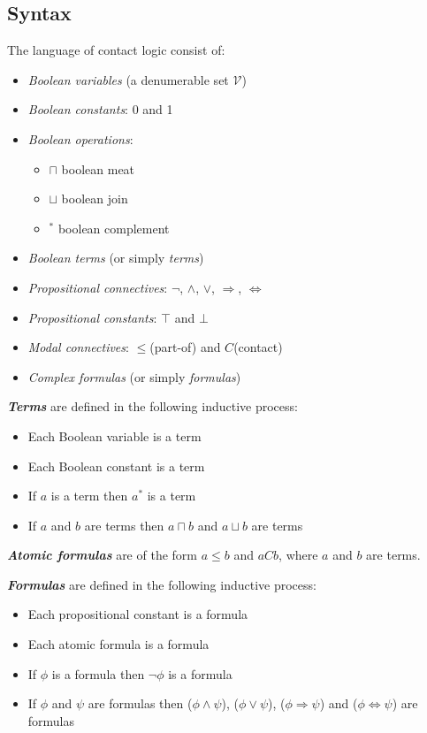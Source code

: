 \documentclass{article}
\newcommand\V{\mathcal{V}}
\begin{document}
	\subsection{Syntax}
	The language of contact logic consist of:
	\begin{itemize}
		\item \textit{Boolean variables} (a denumerable set $\V$)
		\item \textit{Boolean constants}: 0 and 1
		\item \textit{Boolean operations}:
		\begin{itemize}
			\item $\sqcap$ boolean meat
			\item $\sqcup$ boolean join
			\item $^*$ boolean complement
		\end{itemize}
		\item \textit{Boolean terms} (or simply \textit{terms})
		\item \textit{Propositional connectives}: $\neg$, $\land$, $\lor$, $\Rightarrow$, $\Leftrightarrow$
		\item \textit{Propositional constants}: $\top$ and $\bot$
		\item \textit{Modal connectives}: $\leq$(part-of) and $C$(contact)
		\item \textit{Complex formulas} (or simply \textit{formulas})
	\end{itemize}

	\noindent\textbf{\textit{Terms}} are defined in the following inductive process:
	\begin{itemize}
		\item Each Boolean variable is a term
		\item Each Boolean constant is a term
		\item If $a$ is a term then $a^*$ is a term
		\item If $a$ and $b$ are terms then $a \sqcap b$ and $a \sqcup b$ are terms
	\end{itemize}

	\noindent\textbf{\textit{Atomic formulas}} are of the form $a \leq b$ and $aCb$, where $a$ and $b$ are terms.

	\noindent\textbf{\textit{Formulas}} are defined in the following inductive process:
	\begin{itemize}
		\item Each propositional constant is a formula
		\item Each atomic formula is a formula
		\item If $\phi$ is a formula then $\neg\phi$ is a formula
		\item If $\phi$ and $\psi$ are formulas then ($\phi \land \psi$), ($\phi \lor \psi$), ($\phi \Rightarrow \psi$) and ($\phi \Leftrightarrow \psi$) are formulas
	\end{itemize}
\end{document}
